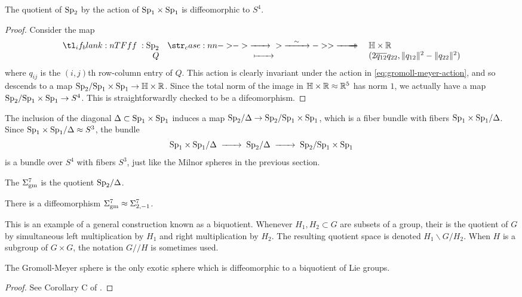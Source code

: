 \begin{proposition}
	The quotient of $\mathrm{Sp}_2$ by the action of $\mathrm{Sp}_1\times \mathrm{Sp}_1$ is diffeomorphic to $S^4$.
\end{proposition}
\begin{proof}
	Consider the map
	\[
		\lkxfunc{f}{\Sp_2}{\HH\times \R}{Q}{(2\overline{q_{12}}q_{22}, \|q_{12}\|^2 - \|q_{22}\|^2)}
	\]
	where $q_{ij}$ is the $(i,j)$th row-column entry of $Q$. This action is clearly invariant under the action in \cref{eq:gromoll-meyer-action}, and so descends to a map $\mathrm{Sp}_2/\mathrm{Sp}_1\times \mathrm{Sp}_1 \to \mathbb{H}\times \mathbb{R}$. Since the total norm of the image in $\mathbb{H}\times \mathbb{R}\approx \mathbb{R}^5$ has norm $1$, we actually have a map $\mathrm{Sp}_2/\mathrm{Sp}_1\times \mathrm{Sp}_1\to S^4$. This is straightforwardly checked to be a difeomorphism.
\end{proof}

The inclusion of the diagonal $\Delta \subset \mathrm{Sp}_1\times \mathrm{Sp}_1$ induces a map $\mathrm{Sp}_2/\Delta \to \mathrm{Sp}_2/\mathrm{Sp}_1\times \mathrm{Sp}_1$, which is a fiber bundle with fibers $\mathrm{Sp}_1\times \mathrm{Sp}_1/ \Delta$. Since $\mathrm{Sp}_1\times \mathrm{Sp}_1/\Delta\approx S^3$, the bundle
\[
	\Sp_1\times\Sp_1/\Delta \lkxto \Sp_2/\Delta \lkxto \Sp_2/\Sp_1\times \Sp_1
\]
is a bundle over $S^4$ with fibers $S^3$, just like the Milnor spheres in the previous section.

\begin{definition}
The  $\Sigma^7_{\mathrm{gm}}$ is the quotient $\mathrm{Sp}_2/\Delta$.
\end{definition}

\begin{proposition}
	There is a diffeomorphism $\Sigma^7_{\mathrm{gm}} \approx \Sigma^7_{2,-1}$.
\end{proposition}

This is an example of a general construction known as a biquotient. Whenever $H_1,H_2\subset G$ are subsets of a group, their  is the quotient of $G$ by simultaneous left multiplication by $H_1$ and right multiplication by $H_2$. The resulting quotient space is denoted $H_1\backslash G/H_2$. When $H$ is a subgroup of $G\times G$, the notation $G/\!/H$ is sometimes used.

\begin{theorem}
	The Gromoll-Meyer sphere is the only exotic sphere which is diffeomorphic to a biquotient of Lie groups.
\end{theorem}
\begin{proof}
	See Corollary C of \cite{KZ2004biquotients}.
\end{proof}

